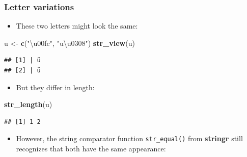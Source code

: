 \documentclass[
]{article}
\newenvironment{Shaded}{\begin{snugshade}}{\end{snugshade}}
\newcommand{\AttributeTok}[1]{\textcolor[rgb]{0.13,0.29,0.53}{#1}}
\newcommand{\FunctionTok}[1]{\textcolor[rgb]{0.13,0.29,0.53}{\textbf{#1}}}
\newcommand{\NormalTok}[1]{#1}
\newcommand{\OtherTok}[1]{\textcolor[rgb]{0.56,0.35,0.01}{#1}}
\newcommand{\SpecialCharTok}[1]{\textcolor[rgb]{0.81,0.36,0.00}{\textbf{#1}}}
\newcommand{\StringTok}[1]{\textcolor[rgb]{0.31,0.60,0.02}{#1}}
\providecommand{\tightlist}{%
  \setlength{\itemsep}{0pt}\setlength{\parskip}{0pt}}
\begin{document}
\begin{Shaded}
\end{Shaded}

\subsubsection{Letter variations}\label{letter-variations}

\begin{itemize}
\tightlist
\item
  These two letters might look the same:
\end{itemize}

\begin{Shaded}
\begin{Highlighting}[]
\NormalTok{u }\OtherTok{\textless{}{-}} \FunctionTok{c}\NormalTok{(}\StringTok{"\textbackslash{}u00fc"}\NormalTok{, }\StringTok{"u\textbackslash{}u0308"}\NormalTok{)}
\FunctionTok{str\_view}\NormalTok{(u)}
\end{Highlighting}
\end{Shaded}

\begin{verbatim}
## [1] | ü
## [2] | ü
\end{verbatim}

\begin{itemize}
\tightlist
\item
  But they differ in length:
\end{itemize}

\begin{Shaded}
\begin{Highlighting}[]
\FunctionTok{str\_length}\NormalTok{(u)}
\end{Highlighting}
\end{Shaded}

\begin{verbatim}
## [1] 1 2
\end{verbatim}

\begin{itemize}
\tightlist
\item
  However, the string comparator function \texttt{str\_equal()} from
  \textbf{stringr} still recognizes that both have the same appearance:
\end{itemize}
\end{document}
